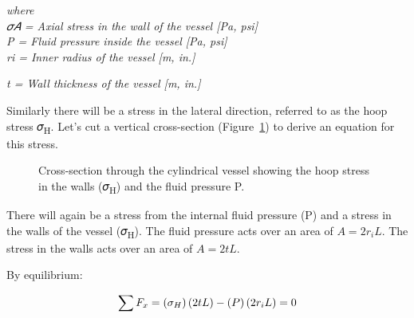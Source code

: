 \documentclass[
  letterpaper,
  DIV=11,
  numbers=noendperiod]{scrreprt}
\theoremstyle{definition}
\theoremstyle{remark}
\begin{document}
\emph{where}\\
\emph{𝜎𝐴 = Axial stress in the wall of the vessel {[}Pa, psi{]}}\\
\emph{P = Fluid pressure inside the vessel {[}Pa, psi{]}}\\
\emph{ri = Inner radius of the vessel {[}m, in.{]}}

\emph{t = Wall thickness of the vessel {[}m, in.{]}}

Similarly there will be a stress in the lateral direction, referred to
as the hoop stress 𝜎\textsubscript{H}. Let's cut a vertical
cross-section (Figure~\ref{fig-13.4}) to derive an equation for this
stress.

\begin{figure}


\caption{\label{fig-13.4}Cross-section through the cylindrical vessel
showing the hoop stress in the walls (𝜎\textsubscript{H}) and the fluid
pressure P.}

\end{figure}%

There will again be a stress from the internal fluid pressure (P) and a
stress in the walls of the vessel (𝜎\textsubscript{H}). The fluid
pressure acts over an area of \(A=2 r_i L\). The stress in the walls
acts over an area of \(A=2 t L\).

By equilibrium:

\[
\sum F_x=\left(\sigma_H\right)(2 t L)-(P)\left(2 r_i L\right)=0 \\
\]
\end{document}
